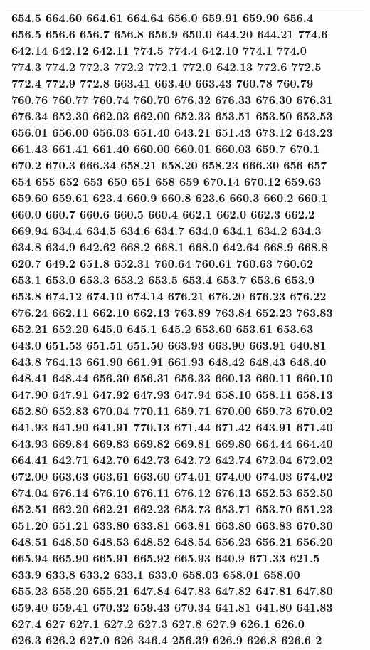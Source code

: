 \begin{longtable}{|R{.05in}|L{.65in}||L{5.65in}|}
654.5 664.60 664.61 664.64 656.0 659.91 659.90 656.4 656.5 656.6 656.7 656.8 656.9 650.0 644.20 644.21 774.6 642.14 642.12 642.11 774.5 774.4 642.10 774.1 774.0 774.3 774.2 772.3 772.2 772.1 772.0 642.13 772.6 772.5 772.4 772.9 772.8 663.41 663.40 663.43 760.78 760.79 760.76 760.77 760.74 760.70 676.32 676.33 676.30 676.31 676.34 652.30 662.03 662.00 652.33 653.51 653.50 653.53 656.01 656.00 656.03 651.40 643.21 651.43 673.12 643.23 661.43 661.41 661.40 660.00 660.01 660.03 659.7 670.1 670.2 670.3 666.34 658.21 658.20 658.23 666.30 656 657 654 655 652 653 650 651 658 659 670.14 670.12 659.63 659.60 659.61 623.4 660.9 660.8 623.6 660.3 660.2 660.1 660.0 660.7 660.6 660.5 660.4 662.1 662.0 662.3 662.2 669.94 634.4 634.5 634.6 634.7 634.0 634.1 634.2 634.3 634.8 634.9 642.62 668.2 668.1 668.0 642.64 668.9 668.8 620.7 649.2 651.8 652.31 760.64 760.61 760.63 760.62 653.1 653.0 653.3 653.2 653.5 653.4 653.7 653.6 653.9 653.8 674.12 674.10 674.14 676.21 676.20 676.23 676.22 676.24 662.11 662.10 662.13 763.89 763.84 652.23 763.83 652.21 652.20 645.0 645.1 645.2 653.60 653.61 653.63 643.0 651.53 651.51 651.50 663.93 663.90 663.91 640.81 643.8 764.13 661.90 661.91 661.93 648.42 648.43 648.40 648.41 648.44 656.30 656.31 656.33 660.13 660.11 660.10 647.90 647.91 647.92 647.93 647.94 658.10 658.11 658.13 652.80 652.83 670.04 770.11 659.71 670.00 659.73 670.02 641.93 641.90 641.91 770.13 671.44 671.42 643.91 671.40 643.93 669.84 669.83 669.82 669.81 669.80 664.44 664.40 664.41 642.71 642.70 642.73 642.72 642.74 672.04 672.02 672.00 663.63 663.61 663.60 674.01 674.00 674.03 674.02 674.04 676.14 676.10 676.11 676.12 676.13 652.53 652.50 652.51 662.20 662.21 662.23 653.73 653.71 653.70 651.23 651.20 651.21 633.80 633.81 663.81 663.80 663.83 670.30 648.51 648.50 648.53 648.52 648.54 656.23 656.21 656.20 665.94 665.90 665.91 665.92 665.93 640.9 671.33 621.5 633.9 633.8 633.2 633.1 633.0 658.03 658.01 658.00 655.23 655.20 655.21 647.84 647.83 647.82 647.81 647.80 659.40 659.41 670.32 659.43 670.34 641.81 641.80 641.83 627.4 627 627.1 627.2 627.3 627.8 627.9 626.1 626.0 626.3 626.2 627.0 626 346.4 256.39 626.9 626.8 626.6 2\\\hline

\end{longtable}
